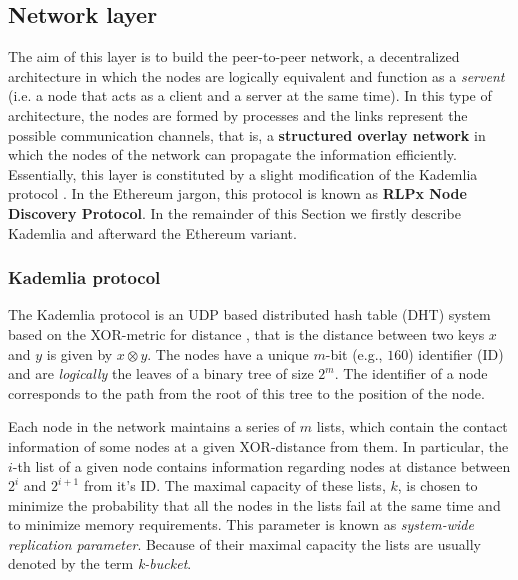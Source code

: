 \subsection{Network layer}
\label{sec:network-layer}

The aim of this layer is to build the peer-to-peer network, a decentralized
architecture in which the nodes are logically equivalent and function as a
\emph{servent} (i.e. a node that acts as a client and a server at the same
time). In this type of architecture, the nodes are formed by processes and the
links represent the possible communication channels, that is, a
\textbf{structured overlay network} \cite{van2017distributed} in which the nodes
of the network can propagate the information efficiently. Essentially, this
layer is constituted by a slight modification of the Kademlia protocol
\cite{bib:kademlia}. In the Ethereum jargon, this protocol is known as
\textbf{RLPx Node Discovery Protocol}.
In the remainder of this Section we firstly describe Kademlia and afterward
the Ethereum variant.


\subsubsection{Kademlia protocol}
The Kademlia protocol is an UDP based distributed hash table (DHT)
system based on the
XOR-metric for distance \cite{bib:kademlia}, that is the distance between two
keys $x$ and $y$ is given by $x \otimes y$.
The nodes have a unique $m$-bit (e.g., $160$) identifier (ID) and are 
\emph{logically} the leaves of a binary tree of size $2^m$. 
The identifier of a node corresponds
to the path from the root of this tree to the position of the node.

Each node in the network maintains a series of $m$
lists, which contain the contact information of some nodes at a given
XOR-distance from them.
In particular, the $i$-th list of a given node contains
information regarding nodes at distance between $2^i$ and $2^{i+1}$ from 
it's ID.
The maximal capacity of these lists, $k$, is chosen to minimize the
probability that all the nodes in the lists fail at the same 
time and to minimize memory requirements.
This parameter is  known as \emph{system-wide replication parameter}.
Because of their maximal capacity the lists are usually denoted by the term
\emph{k-bucket}.


